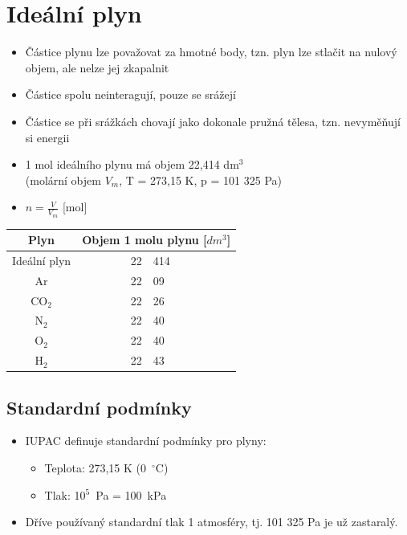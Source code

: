 \section{Ideální plyn}

\begin{itemize}
	\item Částice plynu lze považovat za hmotné body, tzn. plyn lze stlačit na nulový objem, ale nelze jej zkapalnit
	\item Částice spolu neinteragují, pouze se srážejí
	\item Částice se při srážkách chovají jako dokonale pružná tělesa, tzn. nevyměňují si energii
	\item 1 mol ideálního plynu má objem 22,414 dm$^3$ \\ (molární objem $V_m$, T = 273,15 K, p = 101 325 Pa)
	\item $n=\frac{V}{V_m}$ [mol]
\end{itemize}

\begin{center}
	\begin{tabular}{|c|r@{,}l|}
		\hline
		\textbf{Plyn} & \multicolumn{2}{|c|}{\textbf{Objem 1 molu plynu [$dm^3$]}} \\
		\hline
		Ideální plyn & 22 & 414 \\\hline
		Ar & 22 & 09 \\\hline
		CO$_2$ & 22 & 26 \\\hline
		N$_2$ & 22 & 40 \\\hline
		O$_2$ & 22 & 40 \\\hline
		H$_2$ & 22 & 43 \\\hline
	\end{tabular}
\end{center}

\subsection{Standardní podmínky}

\begin{itemize}
	\item IUPAC definuje standardní podmínky pro plyny:
	\begin{itemize}
		\item Teplota: 273,15 K (0~$^\circ$C)
		\item Tlak: 10$^5$~Pa = 100~kPa
	\end{itemize}
	\item Dříve používaný standardní tlak 1 atmosféry, tj. 101 325 Pa je už zastaralý.
\end{itemize}

